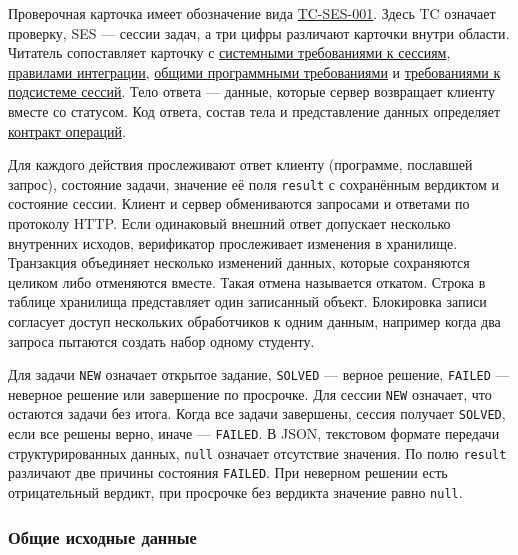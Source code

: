 \documentclass[12pt,a4paper]{article}
\begin{document}
Проверочная карточка имеет обозначение вида {\hyperlink{tc-ses-001}{TC-SES-001}}. Здесь TC означает проверку, SES --- сессии задач, а три цифры различают карточки внутри области. Читатель сопоставляет карточку с {\href{../04\_Системные\_требования/DOC-05\_Системные\_требования.pdf\#doc-05-требования-к-сессиям-задач}{системными требованиями к сессиям}}, {\href{../04\_Системные\_требования/DOC-05\_Системные\_требования.pdf\#doc-05-общесистемная-интеграция}{правилами интеграции}}, {\href{../07\_Программные\_требования/DOC-06\_Программные\_требования.pdf\#doc-06-сводные-программные-требования}{общими программными требованиями}} и {\href{../07\_Программные\_требования/DOC-06.2\_Сессии\_задач\_и\_планировщик.pdf\#doc-062-сессии-задач-и-планировщик}{требованиями к подсистеме сессий}}. Тело ответа --- данные, которые сервер возвращает клиенту вместе со статусом. Код ответа, состав тела и представление данных определяет {\href{../07\_Программные\_требования/DOC-06.2\_Сессии\_задач\_и\_планировщик.pdf\#doc-062-контракты-сессий-задач}{контракт операций}}.

Для каждого действия прослеживают ответ клиенту (программе, пославшей запрос), состояние задачи, значение её поля \texttt{result} с сохранённым вердиктом и состояние сессии. Клиент и сервер обмениваются запросами и ответами по протоколу HTTP. Если одинаковый внешний ответ допускает несколько внутренних исходов, верификатор прослеживает изменения в хранилище. Транзакция объединяет несколько изменений данных, которые сохраняются целиком либо отменяются вместе. Такая отмена называется откатом. Строка в таблице хранилища представляет один записанный объект. Блокировка записи согласует доступ нескольких обработчиков к одним данным, например когда два запроса пытаются создать набор одному студенту.

Для задачи \texttt{NEW} означает открытое задание, \texttt{SOLVED} --- верное решение, \texttt{FAILED} --- неверное решение или завершение по просрочке. Для сессии \texttt{NEW} означает, что остаются задачи без итога. Когда все задачи завершены, сессия получает \texttt{SOLVED}, если все решены верно, иначе --- \texttt{FAILED}. В JSON, текстовом формате передачи структурированных данных, \texttt{null} означает отсутствие значения. По полю \texttt{result} различают две причины состояния \texttt{FAILED}. При неверном решении есть отрицательный вердикт, при просрочке без вердикта значение равно \texttt{null}.

\subsubsection{Общие исходные данные}\label{ux43eux431ux449ux438ux435-ux438ux441ux445ux43eux434ux43dux44bux435-ux434ux430ux43dux43dux44bux435}
\end{document}
